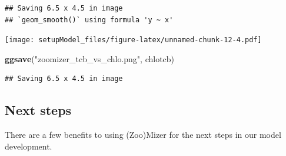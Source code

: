 \documentclass[
]{article}
\newenvironment{Shaded}{\begin{snugshade}}{\end{snugshade}}
\newcommand{\DataTypeTok}[1]{\textcolor[rgb]{0.13,0.29,0.53}{#1}}
\newcommand{\DecValTok}[1]{\textcolor[rgb]{0.00,0.00,0.81}{#1}}
\newcommand{\KeywordTok}[1]{\textcolor[rgb]{0.13,0.29,0.53}{\textbf{#1}}}
\newcommand{\NormalTok}[1]{#1}
\newcommand{\OperatorTok}[1]{\textcolor[rgb]{0.81,0.36,0.00}{\textbf{#1}}}
\newcommand{\StringTok}[1]{\textcolor[rgb]{0.31,0.60,0.02}{#1}}
\begin{document}
\begin{verbatim}
## Saving 6.5 x 4.5 in image
## `geom_smooth()` using formula 'y ~ x'
\end{verbatim}

\begin{Shaded}
\end{Shaded}

\texttt{[image: setupModel\_files/figure-latex/unnamed-chunk-12-4.pdf]}

\begin{Shaded}
\begin{Highlighting}[]
\KeywordTok{ggsave}\NormalTok{(}\StringTok{"zoomizer_tcb_vs_chlo.png"}\NormalTok{, chlotcb)}
\end{Highlighting}
\end{Shaded}

\begin{verbatim}
## Saving 6.5 x 4.5 in image
\end{verbatim}

\begin{Shaded}
\end{Shaded}

\hypertarget{next-steps}{%
\subsection{Next steps}\label{next-steps}}

There are a few benefits to using (Zoo)Mizer for the next steps in our
model development.
\end{document}
